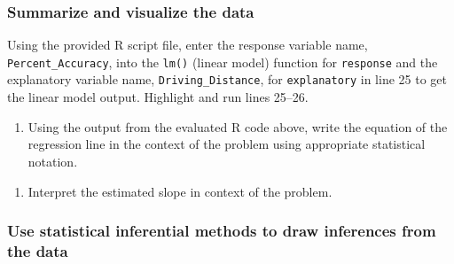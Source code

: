 \documentclass[
]{report}
\newenvironment{Shaded}{\begin{snugshade}}{\end{snugshade}}
\newcommand{\AttributeTok}[1]{\textcolor[rgb]{0.77,0.63,0.00}{#1}}
\newcommand{\CommentTok}[1]{\textcolor[rgb]{0.56,0.35,0.01}{\textit{#1}}}
\newcommand{\DecValTok}[1]{\textcolor[rgb]{0.00,0.00,0.81}{#1}}
\newcommand{\FunctionTok}[1]{\textcolor[rgb]{0.00,0.00,0.00}{#1}}
\newcommand{\NormalTok}[1]{#1}
\newcommand{\OtherTok}[1]{\textcolor[rgb]{0.56,0.35,0.01}{#1}}
\newcommand{\SpecialCharTok}[1]{\textcolor[rgb]{0.00,0.00,0.00}{#1}}
\providecommand{\tightlist}{%
  \setlength{\itemsep}{0pt}\setlength{\parskip}{0pt}}
\begin{document}
\newpage

\hypertarget{summarize-and-visualize-the-data-5}{%
\subsubsection*{Summarize and visualize the data}\label{summarize-and-visualize-the-data-5}}

Using the provided R script file, enter the response variable name, \texttt{Percent\_Accuracy}, into the \texttt{lm()} (linear model) function for \texttt{response} and the explanatory variable name, \texttt{Driving\_Distance}, for \texttt{explanatory} in line 25 to get the linear model output. Highlight and run lines 25--26.

\begin{Shaded}
\end{Shaded}

\begin{enumerate}
\def\labelenumi{\arabic{enumi}.}
\setcounter{enumi}{4}
\tightlist
\item
  Using the output from the evaluated R code above, write the equation of the regression line in the context of the problem using appropriate statistical notation.
\end{enumerate}

\vspace{1in}

\begin{enumerate}
\def\labelenumi{\arabic{enumi}.}
\setcounter{enumi}{5}
\tightlist
\item
  Interpret the estimated slope in context of the problem.
\end{enumerate}

\vspace{1in}

\hypertarget{use-statistical-inferential-methods-to-draw-inferences-from-the-data-6}{%
\subsubsection*{Use statistical inferential methods to draw inferences from the data}\label{use-statistical-inferential-methods-to-draw-inferences-from-the-data-6}}
\end{document}
